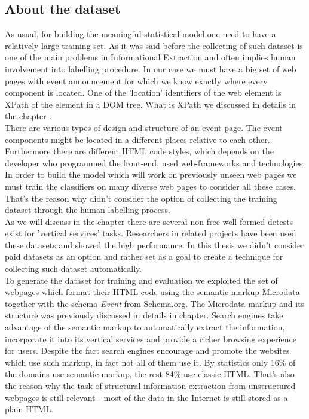 \subsection{About the dataset}
As usual, for building the meaningful statistical model one need to have a relatively large training set. As it was said before the collecting of such dataset is one of the main problems in Informational Extraction and often implies human involvement into labelling procedure. In our case we must have a big set of web pages with event announcement for which we know exactly where every component is located. One of the 'location' identifiers of the web element is XPath of the element in a DOM tree. What is XPath we discussed in details in the chapter .\\

There are various types of design and structure of an event page. The event components might be located in a different places relative to each other. Furthermore there are different HTML code styles, which depends on the developer who programmed the front-end, used web-frameworks and technologies. In order to build the model which will work on previously unseen web pages we must train the classifiers on many diverse web pages to consider all these cases. That's the reason why didn't consider the option of collecting the training dataset through the human labelling process.\\   

As we will discuss in the chapter  there are several non-free well-formed detests exist for 'vertical services' tasks. Researchers in related projects have been used these datasets and showed the high performance. In this thesis we didn't consider paid datasets as an option and rather set as a goal to create a technique for collecting such dataset automatically.\\

To generate the dataset for training and evaluation we exploited the set of webpages which format their HTML code using the semantic markup Microdata together with the schema \textit{Event} from Schema.org. The Microdata markup and its structure was previously discussed in details in  chapter. Search engines take advantage of the semantic markup to automatically extract the information, incorporate it into its vertical services and provide a richer browsing experience for users. Despite the fact search engines encourage and promote the websites which use such markup, in fact not all of them use it. By statistics only 16\% of the domains use semantic markup, the rest 84\% use classic HTML. That's also the reason why the task of structural information extraction from unstructured webpages is still relevant - most of the data in the Internet is still stored as a plain HTML.\\ 

